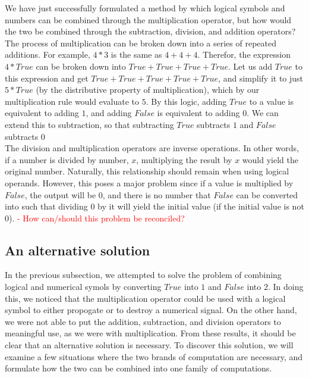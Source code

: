 \documentclass{article}
\begin{document}
 We have just successfully formulated a method by which logical symbols and numbers can be combined through the multiplication operator, but how would the two be combined through the subtraction, division, and addition operators? \\
 
 The process of multiplication can be broken down into a series of repeated additions. For example, $4 * 3$ is the same as $4 + 4 + 4$. Therefor, the expression $4 * True$ can be broken down into $True + True + True + True$. Let us add $True$ to this expression and get $True + True + True + True + True$, and simplify it to just $5 * True$ (by the distributive property of multiplication), which by our multiplication rule would evaluate to $5$. By this logic, adding $True$ to a value is equivalent to adding $1$, and adding $False$ is equivalent to adding $0$. We can extend this to subtraction, so that subtracting $True$ subtracts $1$ and $False$ subtracts $0$ \\

 The division and multiplication operators are inverse operations. In other words, if a number is divided by number, $x$, multiplying the result by $x$ would yield the original number. Naturally, this relationship should remain when using logical operands. However, this poses a major problem since if a value is multiplied by $False$, the output will be $0$, and there is no number that $False$ can be converted into such that dividing $0$ by it will yield the initial value (if the initial value is not $0$).
\textcolor{red}{- How can/should this problem be reconciled?} \\

\subsection{An alternative solution}

	In the previous subsection, we attempted to solve the problem of combining logical and numerical symols by converting $True$ into $1$ and $False$ into $2$. In doing this, we noticed that the multiplication operator could be used with a logical symbol to either propogate or to destroy a numerical signal. On the other hand, we were not able to put the addition, subtraction, and division operators to meaningful use, as we were with multiplication. From these results, it should be clear that an alternative solution is necessary. To discover this solution, we will examine a few situations where the two brands of computation are necessary, and formulate how the two can be combined into one family of computations. 
	
\end{document}
